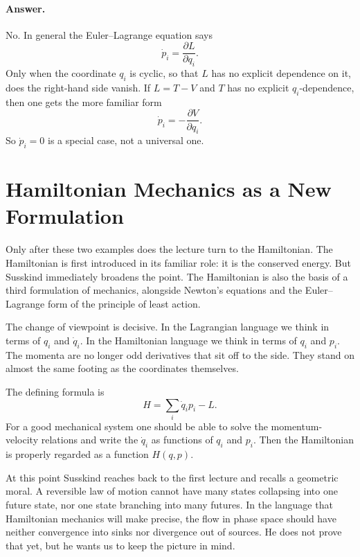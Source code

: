 \paragraph{Answer.} No. In general the Euler--Lagrange equation says
\begin{equation}
\dot p_i=\frac{\partial L}{\partial q_i}.
\end{equation}
Only when the coordinate \(q_i\) is cyclic, so that \(L\) has no explicit dependence on it, does the right-hand side vanish. If \(L=T-V\) and \(T\) has no explicit \(q_i\)-dependence, then one gets the more familiar form
\begin{equation}
\dot p_i=-\frac{\partial V}{\partial q_i}.
\end{equation}
So \(\dot p_i=0\) is a special case, not a universal one.

\section{Hamiltonian Mechanics as a New Formulation}

Only after these two examples does the lecture turn to the Hamiltonian. The Hamiltonian is first introduced in its familiar role: it is the conserved energy. But Susskind immediately broadens the point. The Hamiltonian is also the basis of a third formulation of mechanics, alongside Newton's equations and the Euler--Lagrange form of the principle of least action.

The change of viewpoint is decisive. In the Lagrangian language we think in terms of \(q_i\) and \(\dot q_i\). In the Hamiltonian language we think in terms of \(q_i\) and \(p_i\). The momenta are no longer odd derivatives that sit off to the side. They stand on almost the same footing as the coordinates themselves.

The defining formula is
\begin{equation}
H=\sum_i \dot q_i p_i-L.
\end{equation}
For a good mechanical system one should be able to solve the momentum-velocity relations and write the \(\dot q_i\) as functions of \(q_i\) and \(p_i\). Then the Hamiltonian is properly regarded as a function \(H(q,p)\).

At this point Susskind reaches back to the first lecture and recalls a geometric moral. A reversible law of motion cannot have many states collapsing into one future state, nor one state branching into many futures. In the language that Hamiltonian mechanics will make precise, the flow in phase space should have neither convergence into sinks nor divergence out of sources. He does not prove that yet, but he wants us to keep the picture in mind.

